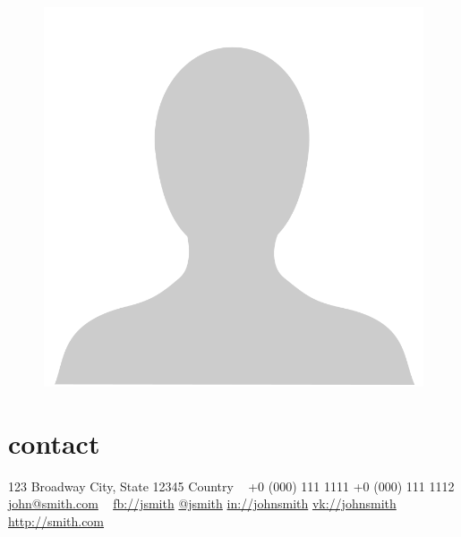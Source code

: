\documentclass[a4paper]{cv-friggeri-k}
\begin{document}


\begin{aside} %
%
\begin{figure}%
\includegraphics[width=\linewidth]{resources/id-photo-sample.png}%
\end{figure}%
%
\section{contact}
{\Large\textcolor{gray}{\faMapMarker}} \hfill 123 Broadway
City, State 12345
Country
~
{\textcolor{gray}{\faPhone}} \hfill +0 (000) 111 1111
{\Large\textcolor{gray}{\faMobilePhone}} \hfill +0 (000) 111 1112
{\textcolor{gray}{\faEnvelope}} \hfill \href{mailto:john@smith.com}{john@smith.com}
~
{\textcolor{gray}{\faFacebook}} \hfill \href{http://facebook.com/johnsmith}{fb://jsmith}
{\textcolor{gray}{\faTwitter}} \hfill \href{http://twitter.com/johnsmith}{@jsmith}
{\textcolor{gray}{\faLinkedin}} \hfill \href{http://linkedin.com/johnsmith}{in://johnsmith}
{\textcolor{gray}{\faVk}} \hfill \href{http://vk.com/johnsmith}{vk://johnsmith}
~
{\textcolor{gray}{\faGlobe}} \hfill \href{http://smith.com}{http://smith.com}

\end{aside}
\end{document}
